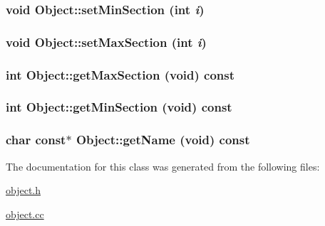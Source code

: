 \hypertarget{classObject_2d0c6724dcfc370c55eefe0cb7ea9ddf}{
\subsubsection[setMinSection]{\setlength{\rightskip}{0pt plus 5cm}void Object::setMinSection (int {\em i})}}
\label{classObject_2d0c6724dcfc370c55eefe0cb7ea9ddf}


\hypertarget{classObject_394f310255028c4c4475e98ba58b8243}{
\subsubsection[setMaxSection]{\setlength{\rightskip}{0pt plus 5cm}void Object::setMaxSection (int {\em i})}}
\label{classObject_394f310255028c4c4475e98ba58b8243}


\hypertarget{classObject_f429250aa5672a356e20fa73d8e2612a}{
\subsubsection[getMaxSection]{\setlength{\rightskip}{0pt plus 5cm}int Object::getMaxSection (void) const}}
\label{classObject_f429250aa5672a356e20fa73d8e2612a}


\hypertarget{classObject_6b0181000881749e20b32ae92a2b027e}{
\subsubsection[getMinSection]{\setlength{\rightskip}{0pt plus 5cm}int Object::getMinSection (void) const}}
\label{classObject_6b0181000881749e20b32ae92a2b027e}


\hypertarget{classObject_c251f5325509fb0e624455b68c29cd40}{
\subsubsection[getName]{\setlength{\rightskip}{0pt plus 5cm}char const$\ast$ Object::getName (void) const}}
\label{classObject_c251f5325509fb0e624455b68c29cd40}




The documentation for this class was generated from the following files:\begin{CompactItemize}
\item 
\hyperlink{object_8h}{object.h}\item 
\hyperlink{object_8cc}{object.cc}\end{CompactItemize}

